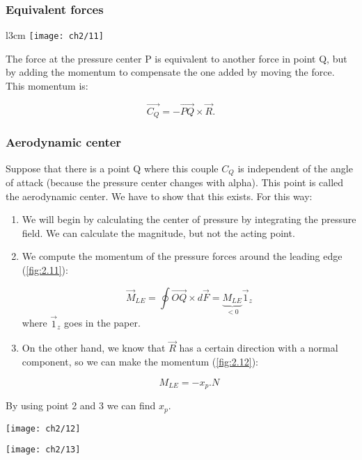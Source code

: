 				\subsubsection{Equivalent forces}
					\begin{wrapfigure}[7]{l}{3cm}
					\vspace{-5mm}
					\texttt{[image: ch2/11]}
					\end{wrapfigure}
					The force at the pressure center P is equivalent to another force in point Q, but by adding the momentum to compensate the one added by moving the force. This momentum is:
					
					\begin{equation}
					\vec{C_Q} = -\vec{PQ}\times \vec{R}.
					\end{equation}
					
				\subsubsection{Aerodynamic center}
					Suppose that there is a point Q where this couple $C_Q$ is independent of the angle of attack (because the pressure center changes with alpha). This point is called the aerodynamic center. We have to show that this exists. For this way:
					\begin{enumerate}
						\item We will begin by calculating the center of pressure by integrating the pressure field. We can calculate the magnitude, but not the acting point. 
						
						\item We compute the momentum of the pressure forces around the leading edge (\autoref{fig:2.11}):
						
						\begin{equation}
						\vec{M}_{LE} = \oint \vec{OQ} \times d\vec{F} = \underbrace{M_{LE}}_{<0} \vec{1}_z 
						\end{equation}
						where $\vec{1}_z$ goes in the paper. 						
						
						\item On the other hand, we know that $\vec{R}$ has a certain direction with a normal component, so we can make the momentum (\autoref{fig:2.12}): 
						
						\begin{equation}
						M_{LE} = -x_p.N
						\end{equation}
					\end{enumerate}
					
					By using point 2 and 3 we can find $x_{p}$.
					
					\begin{center}
					\begin{minipage}{0.4\textwidth}
					\texttt{[image: ch2/12]}
					\label{fig:2.11}
					\end{minipage}
					\begin{minipage}{0.4\textwidth}
					\texttt{[image: ch2/13]}
					\label{fig:2.12}
					\end{minipage}
					\end{center}